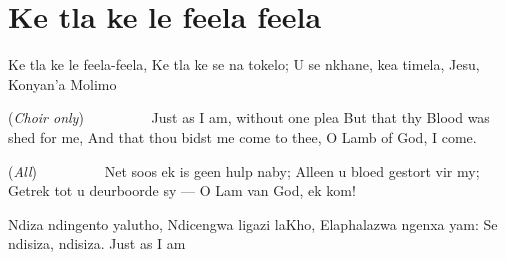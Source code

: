 \starttocol
\chapter{Ke tla ke le feela feela}
\nexttocol
\hfill{\it }
\stoptocol
\starttocol
\startlines
{\sc Ke} tla ke le feela-feela,
Ke tla ke se na tokelo;
U se nkhane, kea timela,
Jesu, Konyan'a Molimo

          \hfill({\it Choir only})~~~~~~~~~
Just as I am, without one plea
But that thy Blood was shed for me,
And that thou bidst me come to thee,
O Lamb of God, I come.

          \hfill({\it All})~~~~~~~~~
Net soos ek is geen hulp naby;
Alleen u bloed gestort vir my;
Getrek tot u deurboorde sy ---
O Lam van God, ek kom!

Ndiza ndingento yalutho,
Ndicengwa ligazi laKho,
Elaphalazwa ngenxa yam:
Se ndisiza, ndisiza.
\stoplines
\nexttocol
Just as I am
\stoptocol

